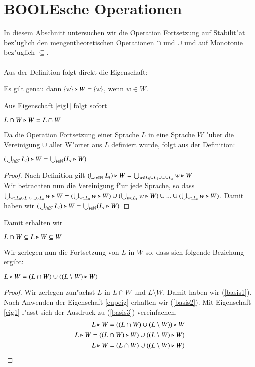 \section{BOOLEsche Operationen}
In diesem Abschnitt untersuchen wir die Operation Fortsetzung auf Stabilit"at bez"uglich den mengentheoretischen Operationen $\cap$ und $\cup$ und auf Monotonie bez"uglich $\subseteq$.
\\\\Aus der Definition folgt direkt die Eigenschaft:
\begin{eigen}\label{eig1}
Es gilt genau dann $\{w\} \triangleright W = \{w\}$, wenn $w\in W$.
\end{eigen}
Aus Eigenschaft \ref{eig1} folgt sofort
\begin{folg}
$L\cap W \triangleright W = L\cap W$
\end{folg}

Da die Operation Fortsetzung einer Sprache $L$ in eine Sprache $W$ "uber die Vereinigung $\cup$ aller W"orter aus $L$ definiert wurde, folgt aus der Definition:
\begin{eigen}\label{cupeig}
$(\bigcup_{i\in\mathbb{N}} L_i) \triangleright W = \bigcup_{i\in\mathbb{N}} (L_i\triangleright W)$
\end{eigen}
\begin{proof} 
Nach Definition gilt $(\bigcup_{i\in\mathbb{N}} L_i) \triangleright W = \bigcup_{w\in L_0\cup L_1\cup ... \cup L_n} w\triangleright W$\\
Wir betrachten nun die Vereinigung f"ur jede Sprache, so dass $\bigcup_{w\in L_0\cup L_1\cup ... \cup L_n} w\triangleright W = (\bigcup_{w\in L_0} w\triangleright W) \cup (\bigcup_{w\in L_1} w\triangleright W) \cup ... \cup (\bigcup_{w\in L_n} w\triangleright W)$. Damit haben wir $ (\bigcup_{i\in\mathbb{N}} L_i) \triangleright W  = \bigcup_{i\in\mathbb{N}} (L_i\triangleright W)$
\end{proof}

Damit erhalten wir
\begin{folg}\label{klaro}
$L\cap W \subseteq L\triangleright W \subseteq W$
\end{folg}
Wir zerlegen nun die Fortsetzung von $L$ in $W$ so, dass sich folgende Beziehung ergibt:

\begin{eigen}\label{basiseigen}
$L\triangleright W = (L\cap W) \cup ((L\setminus W) \triangleright W)$
\end{eigen}
\begin{proof}
Wir zerlegen zun"achst $L$ in $L\cap W$ und $L\setminus W$. Damit haben wir (\ref{basis1}). 
Nach Anwenden der Eigenschaft \ref{cupeig} erhalten wir (\ref{basis2}). Mit Eigenschaft \ref{eig1} l"asst sich der Ausdruck zu (\ref{basis3}) vereinfachen.
\begin{eqnarray}
L\triangleright W = ((L\cap W) \cup (L\setminus W)) \triangleright W \label{basis1}\\
L\triangleright W = ((L\cap W) \triangleright W) \cup ((L\setminus W) \triangleright W) \label{basis2} \\
L\triangleright W = (L\cap W) \cup ((L\setminus W) \triangleright W) \label{basis3} 
\end{eqnarray}
\end{proof}

